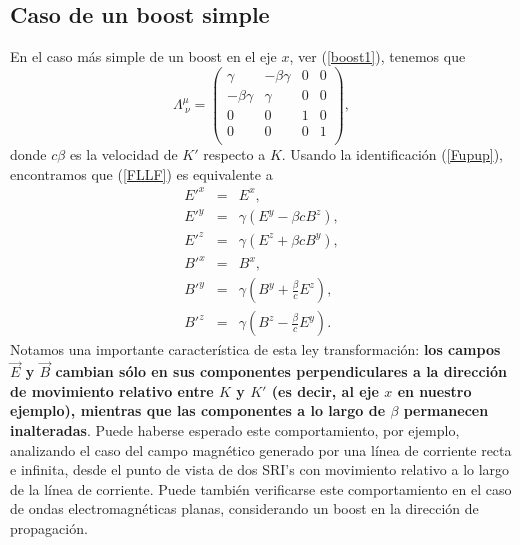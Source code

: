 \subsection{Caso de un boost simple}
En el caso más simple de un boost en el eje $x$, ver (\ref{boost1}), tenemos
que
\begin{equation}
\Lambda^\mu_{\ \nu}=\left( \begin{array}{cccc}
\gamma & -\beta\gamma & 0 & 0\\
-\beta\gamma & \gamma & 0 & 0\\
0 & 0 & 1 & 0\\
0 & 0 & 0 & 1\\
\end{array}\right) ,
\end{equation}
donde $c\beta$ es la velocidad de $K'$ respecto a $K$. Usando la identificación
(\ref{Fupup}), encontramos que (\ref{FLLF}) es equivalente a
\begin{eqnarray}
E'^x &=& E^x ,\\
E'^y &=& \gamma ( E^y - \beta cB^z ) ,\\
E'^z &=& \gamma ( E^z + \beta cB^y ) ,\\
B'^x &=& B^x ,\\
B'^y &=& \gamma (B^y + \frac{\beta}{c} E^z) ,\\
B'^z &=& \gamma (B^z - \frac{\beta}{c} E^y).
\end{eqnarray}
Notamos una importante característica de esta ley transformación: \textbf{los campos $\vec{E}$ y $\vec{B}$ cambian sólo en sus componentes perpendiculares a la dirección de movimiento relativo entre $K$ y $K'$ (es decir, al eje $x$ en nuestro ejemplo), mientras que las componentes a lo largo de $\beta$ permanecen inalteradas}. 
Puede haberse esperado este comportamiento, por ejemplo,
analizando el caso del campo magnético generado por una línea de corriente
recta e infinita, desde el punto de vista de dos SRI's con movimiento relativo a lo largo de la línea de corriente. Puede también verificarse este comportamiento en el caso de ondas electromagnéticas planas, considerando un boost en la dirección de propagación.

